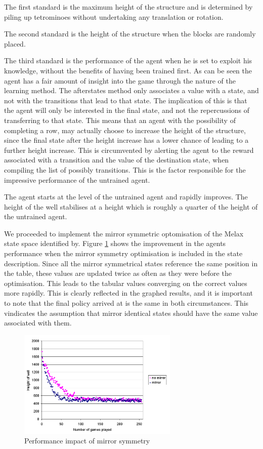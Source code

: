 \documentclass{rucsthesis}
\begin{document}
The first standard is the maximum height of the structure and is determined by piling up tetrominoes without undertaking any translation or rotation.

The second standard is the height of the structure when the blocks are randomly placed.

The third standard is the performance of the agent when he is set to exploit his knowledge, without the benefits of having been trained first. As can be seen the agent has a fair amount of insight into the game through the nature of the learning method. The afterstates method only associates a value with a state, and not with the transitions that lead to that state. The implication of this is that the agent will only be interested in the final state, and not the repercussions of transferring to that state. This means that an agent with the possibility of completing a row, may actually choose to increase the height of the structure, since the final state after the height increase has a lower chance of leading to a further height increase. This is circumvented by alerting the agent to the reward associated with a transition and the value of the destination state, when compiling the list of possibly transitions. This is the factor responsible for the impressive performance of the untrained agent.

The agent starts at the level of the untrained agent and rapidly improves. The height of the well stabilises at a height which is roughly a quarter of the height of the untrained agent.

We proceeded to implement the mirror symmetric optomisation of the Melax state space identified by\cite{yaeltetris}. Figure \ref{fig:comparemelax} shows the improvement in the agents performance when the mirror symmetry optimisation is included in the state description. Since all the mirror symmetrical states reference the same position in the table, these values are updated twice as often as they were before the optimisation. This leads to the tabular values converging on the correct values more rapidly. This is clearly reflected in the graphed results, and it is important to note that the final policy arrived at is the same in both circumstances. This vindicates the assumption that mirror identical states should have the same value associated with them.

\begin{figure}[h]
\centering
\includegraphics[width=3in]{mirrormelax.png}
\caption{Performance impact of mirror symmetry}
\label{fig:comparemelax}
\end{figure}
\end{document}
